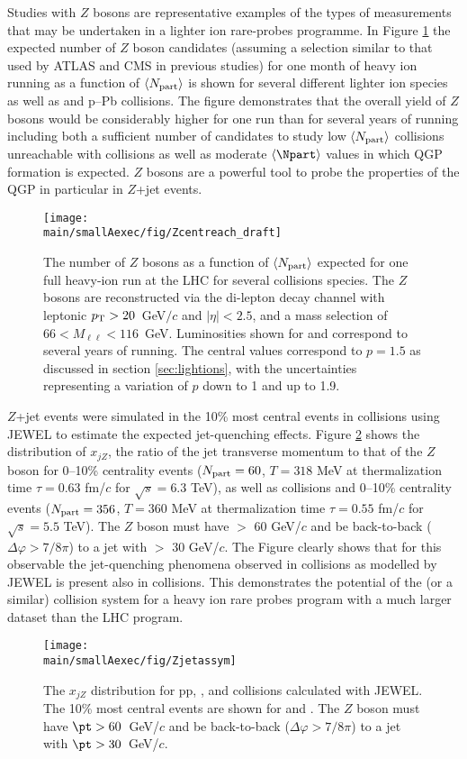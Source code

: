 Studies with $Z$ bosons are representative examples of the types of measurements that may be undertaken in a lighter ion rare-probes programme.  In Figure \ref{fig:Zreach} the expected number of $Z$ boson candidates (assuming a selection similar to that used by ATLAS and CMS in previous studies) for one month of heavy ion running  as a function of $\langle N_{\rm part}\rangle$ is shown for several different lighter ion species as well as \PbPb and p--Pb collisions.  The figure demonstrates that the overall yield of $Z$ bosons would be considerably higher for one \ArAr run than for several years of \PbPb running including both a sufficient number of candidates to study low $\langle N_{\rm part}\rangle$ collisions unreachable with \PbPb collisions as well as moderate $\langle\Npart\rangle$ values in which QGP formation is expected.  $Z$ bosons are a powerful tool to probe the properties of the QGP in particular in $Z$+jet events.  
\begin{figure}
\centering
\texttt{[image: \\main/smallAexec/fig/Zcentreach\_draft]}
\caption{
The number of $Z$ bosons as a function of $\langle N_{\rm part}\rangle$ expected for one full heavy-ion run at the LHC for several collisions species.  The $Z$ bosons are reconstructed via the di-lepton decay channel with leptonic $p\sb{\scriptstyle\mathrm{T}}>20$~GeV$/c$ and $|\eta|<2.5$, and a mass selection of $66<M_{\ell\ell}<116$~GeV.  Luminosities shown for \PbPb and \pPb correspond to several years of running.  The central values correspond to $p=1.5$ as discussed in section \ref{sec:lightions}, with the uncertainties representing a variation of $p$ down to 1 and up to 1.9.
\label{fig:Zreach}}
\end{figure}

$Z$+jet events were simulated in the 10\% most central events in \ArAr collisions using JEWEL \cite{Zapp:2009ud} to estimate the expected jet-quenching effects.  Figure \ref{fig:ArAr_xjz} shows the distribution of $x_{jZ}$, the ratio of the jet transverse momentum to that of the $Z$ boson for 0--10\% centrality \ArAr events ($N_{\rm part} = 60$, $T=318$ MeV at thermalization time $\tau = 0.63$ fm/$c$ for $\sqrt{s}=6.3$ TeV), as well as \pp collisions and 0--10\% centrality \PbPb events ($N_{\rm part} = 356$, $T=360$ MeV at thermalization time $\tau = 0.55$ fm/$c$ for $\sqrt{s}=5.5$ TeV).  The $Z$ boson must have \pt $>$ 60 GeV/$c$ and be back-to-back ($\Delta\varphi > 7/8\pi$) to a jet with \pt $>$ 30 GeV/$c$.  The Figure clearly shows that for this observable the jet-quenching phenomena observed in \PbPb collisions as modelled by JEWEL is present also in \ArAr collisions.  This demonstrates the potential of the \ArAr (or a similar) collision system for a heavy ion rare probes program with a much larger dataset than the LHC \PbPb program.
\begin{figure}
\centering
\texttt{[image: \\main/smallAexec/fig/Zjetassym]}
\caption{
The $x_{jZ}$ distribution for pp, \PbPb, and \ArAr collisions calculated with JEWEL.  The 10\% most central events are shown for \PbPb and \ArAr.  The $Z$ boson must have $\pt > 60$~GeV/$c$ and be back-to-back ($\Delta\varphi > 7/8\pi$) to a jet with $\pt > 30$~GeV/$c$.    
\label{fig:ArAr_xjz}}
\end{figure}
